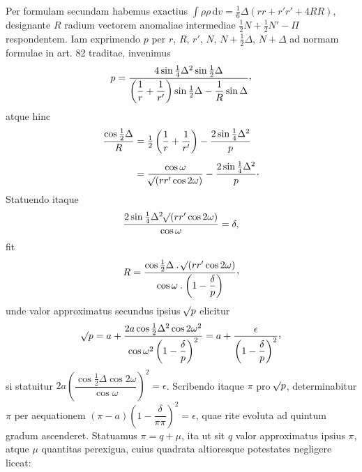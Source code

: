 Per formulam secundam habemus exactius $\int\rho\rho\,\mathrm{d}v=\tfrac16\Delta(rr+r'r'+4RR)$, designante $R$ radium vectorem anomaliae intermediae $\tfrac12N+\tfrac12N'-\Pi$ respondentem. Iam exprimendo $p$ per $r$, $R$, $r'$, $N$, $N+\tfrac12\Delta$, $N+\Delta$ ad normam formulae in art. 82 traditae, invenimus
\[
p=\frac{4\sin\tfrac14\Delta^2\sin\tfrac12\Delta}{\left(\dfrac1r+\dfrac1{r'}\right)\sin\tfrac12\Delta-\dfrac1R\sin\Delta}\mathpunct{\raisebox{.45ex}{,}}
\]
atque hinc
\[
\begin{aligned}
\frac{\cos\tfrac12\Delta}{R}&=\tfrac12\left(\frac1r+\frac1{r'}\right)-\frac{2\sin\tfrac14\Delta^2}{p}\\[4pt]
&=\frac{\cos\omega}{\mathord{{}^{}\!\surd}(rr'\cos2\omega)}-\frac{2\sin\tfrac14\Delta^2}{p}\mathpunct{\cdot}
\end{aligned}
\]
Statuendo itaque
\[
\frac{2\sin\tfrac14\Delta^2\mathord{{}^{}\!\surd}(rr'\cos2\omega)}{\cos\omega}=\delta,
\]
fit
\[
R=\frac{\cos\tfrac12\Delta\mathbin{.}\BareRoot{(rr'\cos2\omega)}}{\cos\omega\mathbin{.}\left(1-\dfrac{\delta}{p}\right)}\mathpunct{\raisebox{.45ex}{,}}
\]
unde valor approximatus secundus ipsius $\mathord{{}^{}\!\surd}p$ elicitur
\[
\BareRoot{p}=a+\frac{2a\cos\tfrac12\Delta^2\cos2\omega^2}{\cos\omega^2\left(1-\dfrac{\delta}{p}\right)^2}=a+\frac{\epsilon}{\left(1-\dfrac{\delta}{p}\right)^2}\mathpunct{\raisebox{.45ex}{,}}
\]
si statuitur $2a\left(\dfrac{\cos\tfrac12\Delta\cos2\omega}{\cos\omega}\right)^2=\epsilon$. Scribendo itaque $\pi$ pro $\mathord{{}^{}\!\surd}p$, determinabitur $\pi$ per aequationem $(\pi-a)\left(1-\dfrac{\delta}{\pi\pi}\right)^2=\epsilon$, quae rite evoluta ad quintum gradum ascenderet. Statuamus $\pi=q+\mu$, ita ut sit $q$ valor approximatus ipsius $\pi$, atque $\mu$ quantitas perexigua, cuius quadrata altioresque potestates negligere liceat:


